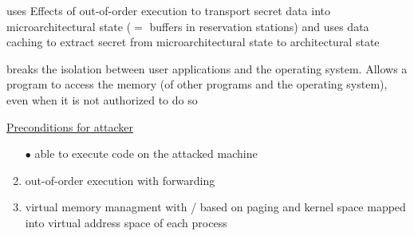 \documentclass[landscape, a4paper]{article}
\begin{document}
\begin{minipage}[t]{0.2\linewidth}
	\begin{betterlist}
		\item uses Effects of \alert{out-of-order execution} to transport secret data into \alert{microarchitectural state} ($=$ buffers in reservation stations) and  uses \alert{data caching} to extract secret from microarchitectural state to \alert{architectural state}
		\begin{betterlist}
			\item breaks the isolation between user applications and the operating system. Allows a program to access the memory (of other programs and the operating system), even when it is not authorized to do so
		\end{betterlist}
		\item \underline{Preconditions for attacker}
		\begin{enumerate}
			\item[\bfseries\color{PrimaryColor}$\bullet$] able to execute code on the attacked machine
			\item out-of-order execution with forwarding
			\item virtual memory managment with / based on paging and kernel space mapped into virtual address space of each process
			\begin{betterlist}

\end{betterlist}
\end{enumerate}
\end{betterlist}
\end{minipage}
\end{document}
